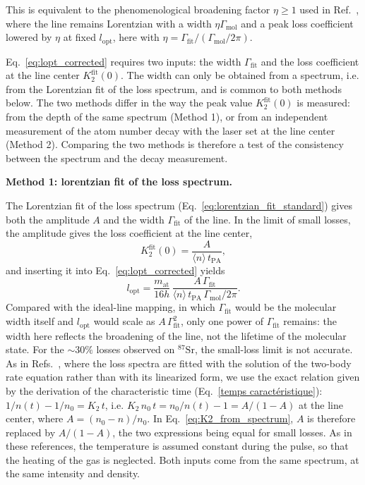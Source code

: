 This is equivalent to the phenomenological broadening factor $\eta\geq1$ used in Ref.~\cite{reschovsky_narrow-line_2018}, where the line remains Lorentzian with a width $\eta\Gamma_{\text{mol}}$ and a peak loss coefficient lowered by $\eta$ at fixed $l_{\text{opt}}$, here with $\eta=\Gamma_{\text{fit}}/(\Gamma_{\text{mol}}/2\pi)$.

Eq.~\ref{eq:lopt_corrected} requires two inputs: the width $\Gamma_{\text{fit}}$ and the
loss coefficient at the line center $K_2^{\text{fit}}(0)$. The width can only be obtained
from a spectrum, i.e. from the Lorentzian fit of the loss spectrum, and is common to both
methods below. The two methods differ in the way the peak value $K_2^{\text{fit}}(0)$ is
measured: from the depth of the same spectrum (Method 1), or from an independent
measurement of the atom number decay with the laser set at the line center (Method 2).
Comparing the two methods is therefore a test of the consistency between the spectrum
and the decay measurement.

\textbf{Method 1: lorentzian fit of the loss spectrum.}

The Lorentzian fit of the loss spectrum (Eq.~\ref{eq:lorentzian_fit_standard}) gives
both the amplitude $A$ and the width $\Gamma_{\text{fit}}$ of the line. In the limit of
small losses, the amplitude gives the loss coefficient at the line center,
\begin{equation}
    K_2^{\text{fit}}(0) = \frac{A}{\langle n\rangle\,t_{\text{PA}}},
    \label{eq:K2_from_spectrum}
\end{equation}
and inserting it into Eq.~\ref{eq:lopt_corrected} yields
\begin{equation}
    l_{\text{opt}} = \frac{m_{\text{at}}}{16h}\,
    \frac{A\,\Gamma_{\text{fit}}}{\langle n\rangle\,t_{\text{PA}}\,\Gamma_{\text{mol}}/2\pi}.
\end{equation}
Compared with the ideal-line mapping, in which $\Gamma_{\text{fit}}$ would be the
molecular width itself and $l_{\text{opt}}$ would scale as $A\,\Gamma_{\text{fit}}^2$,
only one power of $\Gamma_{\text{fit}}$ remains: the width here reflects the
broadening of the line, not the lifetime of the molecular state. For the
$\sim30\%$ losses observed on $^{87}\text{Sr}$, the small-loss limit is not accurate. As
in Refs.~\cite{zelevinsky_narrow_2006,blatt_systematic_2011}, where the loss spectra
are fitted with the solution of the two-body rate equation rather than with its
linearized form, we use the exact relation given by the derivation of the
characteristic time (Eq.~\ref{temps caractéristique}): $1/n(t)-1/n_0=K_2\,t$, i.e.
$K_2\,n_0\,t=n_0/n(t)-1=A/(1-A)$ at the line center, where $A=(n_0-n)/n_0$. In
Eq.~\ref{eq:K2_from_spectrum}, $A$ is therefore replaced by $A/(1-A)$, the two
expressions being equal for small losses. As in these references, the temperature is
assumed constant during the pulse, so that the heating of the gas is neglected. Both
inputs come from the same spectrum, at the same intensity and density.

